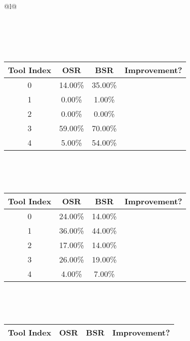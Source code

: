 \begin{longtable}{@{}l@{}}
\begin{minipage}{\textwidth}
\begin{tabular}{|c|c|c|c|}
\end{tabular}
\end{minipage}\\[2ex]
\begin{minipage}{\textwidth}
\centering\vspace{2ex}
\\[0.8ex]
\begin{tabular}{|c|c|c|c|} \hline
\textbf{Tool Index} & \textbf{OSR} & \textbf{ BSR} & \textbf{Improvement?} \\ \hline
0 & 14.00\% & 35.00\% & \textcolor{green}{\ding{51}} \\ \hline
1 & 0.00\% & 1.00\% & \textcolor{green}{\ding{51}} \\ \hline
2 & 0.00\% & 0.00\% & \textcolor{red}{\ding{55}} \\ \hline
3 & 59.00\% & 70.00\% & \textcolor{green}{\ding{51}} \\ \hline
4 & 5.00\% & 54.00\% & \textcolor{green}{\ding{51}} \\ \hline
\end{tabular}
\end{minipage}\\[2ex]
\begin{minipage}{\textwidth}
\centering\vspace{2ex}
\\[0.8ex]
\begin{tabular}{|c|c|c|c|} \hline
\textbf{Tool Index} & \textbf{OSR} & \textbf{ BSR} & \textbf{Improvement?} \\ \hline
0 & 24.00\% & 14.00\% & \textcolor{red}{\ding{55}} \\ \hline
1 & 36.00\% & 44.00\% & \textcolor{green}{\ding{51}} \\ \hline
2 & 17.00\% & 14.00\% & \textcolor{red}{\ding{55}} \\ \hline
3 & 26.00\% & 19.00\% & \textcolor{red}{\ding{55}} \\ \hline
4 & 4.00\% & 7.00\% & \textcolor{green}{\ding{51}} \\ \hline
\end{tabular}
\end{minipage}\\[2ex]
\begin{minipage}{\textwidth}
\centering\vspace{2ex}
\\[0.8ex]
\begin{tabular}{|c|c|c|c|} \hline
\textbf{Tool Index} & \textbf{OSR} & \textbf{ BSR} & \textbf{Improvement?} \\ \hline

\end{tabular}
\end{minipage}
\end{longtable}
